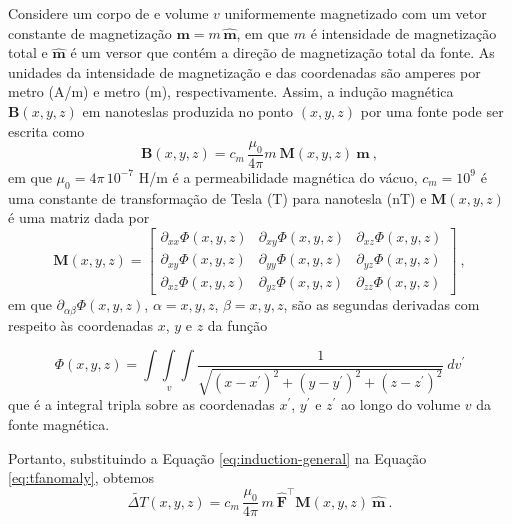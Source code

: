 Considere um corpo de e volume $v$ uniformemente magnetizado com um vetor constante de magnetização $\mathbf{m} = m \, \hat{\mathbf{m}}$, em que $ m $ é intensidade de magnetização total e $ \hat{\mathbf{m}} $ é um versor que contém a direção de magnetização total da fonte. 
As unidades da intensidade de magnetização e das coordenadas são amperes por metro (A/m) e metro (m), respectivamente. 
Assim, a indução magnética $\mathbf{B}(x, y, z)$ em nanoteslas produzida no ponto $(x, y, z)$ por uma fonte pode ser escrita como
\begin{equation}
\mathbf{B}(x, y, z) = c_{m} \, \frac{\mu_{0}}{4\pi}m \: \mathbf{M}(x, y, z) \: 
\hat{\mathbf{m}} \: ,
\label{eq:induction-general}
\end{equation}
em que $\mu_{0} = 4\pi \, 10^{-7}$ H/m é a permeabilidade magnética do vácuo, 
$c_{m} = 10^{9}$ é uma constante de transformação de Tesla (T) para nanotesla (nT) e $\mathbf{M}(x, y, z)$ é uma matriz dada por
\begin{equation}
\mathbf{M}(x, y, z) =
\left[
\begin{array}{ccc}
\partial_{xx} \Phi(x, y, z) & \partial_{xy} \Phi(x, y, z) & 
\partial_{xz} \Phi(x, y, z) \\
\partial_{xy} \Phi(x, y, z) & \partial_{yy} \Phi(x, y, z) & 
\partial_{yz} \Phi(x, y, z) \\
\partial_{xz} \Phi(x, y, z) & \partial_{yz} \Phi(x, y, z) & 
\partial_{zz} \Phi(x, y, z)
\end{array}
\right] \: ,
\label{eq:M}
\end{equation}
em que $\partial_{\alpha\beta} \Phi(x, y, z)$, $\alpha = x, y, z$, 
$\beta = x, y, z$, são as segundas derivadas com respeito às coordenadas $x$, $y$ e $z$ da função

\begin{equation}
\Phi(x,y,z) = \int\int\limits_{v}\int \frac{1}{\sqrt{(x - x^{\prime})^{2} + 
		(y - y^{\prime})^{2} + (z - z^{\prime})^{2}}} \: dv^{\prime}
\label{eq:phi}
\end{equation}
que é a integral tripla sobre as coordenadas $x^{\prime}$, $y^{\prime}$ 
e $z^{\prime}$ ao longo do volume $v$ da fonte magnética.

Portanto, substituindo a Equação \ref{eq:induction-general} na Equação \ref{eq:tfanomaly}, obtemos
\begin{equation}
\tilde{\Delta T}(x, y, z) = c_{m} \, \frac{\mu_{0}}{4\pi} \, m \: \hat{\mathbf{F}}^{\top} 
\mathbf{M}(x, y, z) \: \hat{\mathbf{m}} \: .
\label{eq:tfanomaly-general}
\end{equation}

